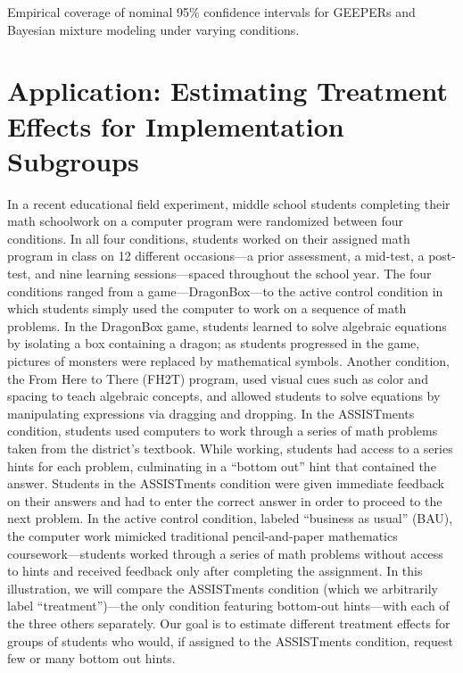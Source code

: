 \documentclass{statsoc} %
\begin{document}
%   

\begin{table}
\caption{Empirical coverage of nominal 95\% confidence intervals for GEEPERs and Bayesian mixture modeling under varying conditions.}
  \label{tab:coverage}
\centering
  
\end{table}


\section{Application: Estimating Treatment Effects for Implementation Subgroups}\label{sec:fh2t}

In a recent educational field experiment, middle school students completing their math schoolwork on a computer program were randomized between four conditions. In all four conditions, students worked on their assigned math program in class on 12 different occasions---a prior assessment, a mid-test, a post-test, and nine learning sessions---spaced throughout the school year.  
The four conditions ranged from a game---DragonBox---to the active control condition in which students simply used the computer to work on a sequence of math problems. 
In the DragonBox game, students learned to solve algebraic equations by isolating a box containing a dragon; as students progressed in the game, pictures of monsters were replaced by mathematical symbols. 
Another condition, the From Here to There (FH2T) program, used visual cues such as color and spacing to teach algebraic concepts, and allowed students to solve equations by manipulating expressions via dragging and dropping.
In the ASSISTments condition, students used computers to work through a series of math problems taken from the district's textbook. While working, students had access to a series hints for each problem, culminating in a ``bottom out'' hint that contained the answer. Students in the ASSISTments condition were given immediate feedback on their answers and had to enter the correct answer in order to proceed to the next problem. 
In the active control condition, labeled ``business as usual'' (BAU), the computer work mimicked traditional pencil-and-paper mathematics coursework---students worked through a series of math problems without access to hints and received feedback only after completing the assignment. 
In this illustration, we will compare the ASSISTments condition (which we arbitrarily label ``treatment'')---the only condition featuring bottom-out hints---with each of the three others separately. Our goal is to estimate different treatment effects for groups of students who would, if assigned to the ASSISTments condition, request few or many bottom out hints. 
\end{document}
